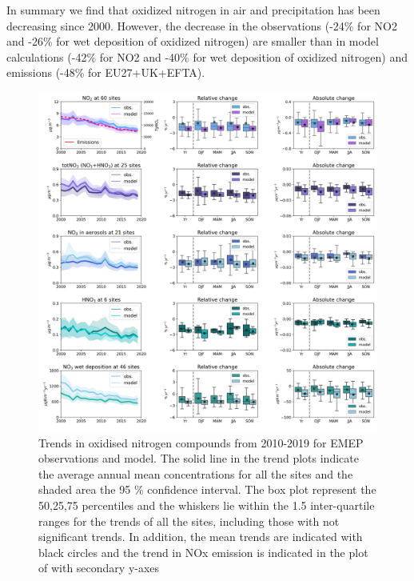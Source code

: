 In summary we find that oxidized nitrogen in air and precipitation has been decreasing since 2000. However, the decrease in the observations (-24\% for NO2 and -26\% for wet deposition of oxidized nitrogen) are smaller than in model calculations (-42\% for NO2 and -40\% for wet deposition of oxidized nitrogen) and emissions (-48\% for EU27+UK+EFTA). 

\begin{figure}[h]
	\centering
	\includegraphics[width=0.74\paperwidth]{FIGS_TRENDS/Nox_trends.png}
	\caption{\label{fig:NOx_trends}Trends in oxidised nitrogen compounds from 2010-2019 for EMEP observations and model. The solid line in the trend plots indicate the average annual mean concentrations for all the sites and the shaded area the 95 \% confidence interval. The box plot represent the 50,25,75 percentiles and the whiskers lie within the 1.5 inter-quartile ranges for the trends of all the sites, including those with not significant trends. In addition, the mean trends are indicated with black circles and the trend in NOx emission is indicated in the plot of \noii with secondary y-axes}
\end{figure}

